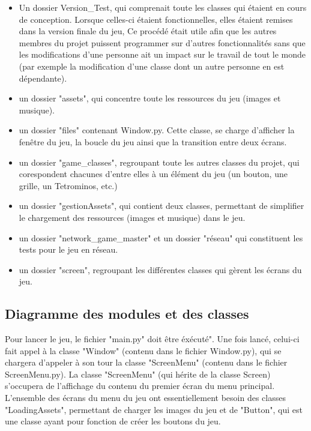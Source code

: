 \documentclass[a4paper, 11pt]{article}
\begin{document}
            \begin{itemize}
                \item Un dossier Version\_Test, qui comprenait toute les classes qui étaient en cours de conception. Lorsque celles-ci étaient fonctionnelles, elles étaient remises dans la version finale du jeu, Ce procédé était utile afin que les autres membres du projet puissent programmer sur d'autres fonctionnalités sans que les modifications d'une personne ait un impact sur le travail de tout le monde (par exemple la modification d'une classe dont un autre personne en est dépendante).
                \item un dossier "assets", qui concentre toute les ressources du jeu (images et musique).
                \item un dossier "files" contenant Window.py. Cette classe, se charge d'afficher la fenêtre du jeu, la boucle du jeu ainsi que la transition entre deux écrans.
                \item un dossier "game\_classes", regroupant toute les autres classes du projet, qui corespondent chacunes d'entre elles à un élément du jeu (un bouton, une grille, un Tetrominos, etc.)
                \item un dossier "gestionAssets", qui contient deux classes, permettant de simplifier le chargement des ressources (images et musique) dans le jeu.
                 \item un dossier "network\_game\_master" et un dossier "réseau" qui constituent les tests pour le jeu en réseau.
                \item un dossier "screen", regroupant les différentes classes qui gèrent les écrans du jeu. 
                
            \end{itemize}
        
        \subsection{Diagramme des modules et des classes}
            Pour lancer le jeu, le fichier "main.py" doit être éxécuté". Une fois lancé, celui-ci fait appel à la classe "Window" (contenu dans le fichier Window.py), qui se chargera d'appeler à son tour la classe "ScreenMenu" (contenu dans le fichier ScreenMenu.py). La classe "ScreenMenu" (qui hérite de la classe Screen) s'occupera de l'affichage du contenu du premier écran du menu principal. L'ensemble des écrans du menu du jeu ont essentiellement besoin des classes "LoadingAssets", permettant de charger les images du jeu et de "Button", qui est une classe ayant pour fonction de créer les boutons du jeu.
            
\end{document}
